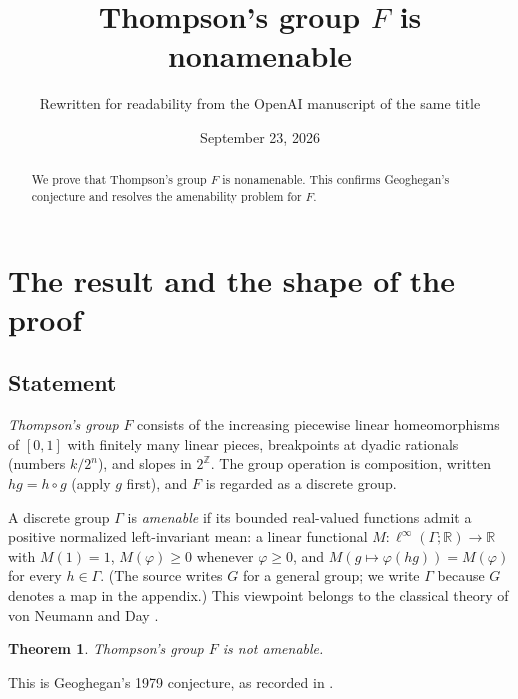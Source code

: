 \documentclass[11pt]{article}
\title{Thompson's group \(F\) is nonamenable}
\author{Rewritten for readability from the OpenAI manuscript of the same title}
\date{September 23, 2026}
\newcommand{\R}{\mathbb R}
\newcommand{\Z}{\mathbb Z}
\newtheorem{theorem}{Theorem}[section]
\theoremstyle{definition}
\numberwithin{equation}{section}
\begin{document}
\maketitle
\begin{abstract}
We prove that Thompson's group \(F\) is nonamenable. This confirms
Geoghegan's conjecture and resolves the amenability problem for \(F\).
\end{abstract}

\section{The result and the shape of the proof}
\label{sec:introduction}

\subsection{Statement}

\emph{Thompson's group} \(F\) consists of the increasing piecewise linear
homeomorphisms of \([0,1]\) with finitely many linear pieces, breakpoints at
dyadic rationals (numbers \(k/2^n\)), and slopes in \(2^{\Z}\). The group
operation is composition, written \(hg=h\circ g\) (apply \(g\) first), and \(F\)
is regarded as a discrete group.

A discrete group \(\Gamma\) is \emph{amenable} if its bounded real-valued
functions admit a positive normalized left-invariant mean: a linear
functional \(M:\ell^\infty(\Gamma;\R)\to\R\) with \(M(1)=1\),
\(M(\varphi)\ge0\) whenever \(\varphi\ge0\), and
\(M(g\mapsto\varphi(hg))=M(\varphi)\) for every \(h\in\Gamma\).
(The source writes \(G\) for a general group; we write \(\Gamma\) because
\(G\) denotes a map in the appendix.)
This viewpoint belongs to the classical theory of von Neumann and Day
\cite{vonNeumann1929,Day1957}.

\begin{theorem}\label{thm:main}
Thompson's group \(F\) is not amenable.
\end{theorem}

This is Geoghegan's 1979 conjecture, as recorded in
\cite[p.~227]{CannonFloydParry1996}.
\end{document}
